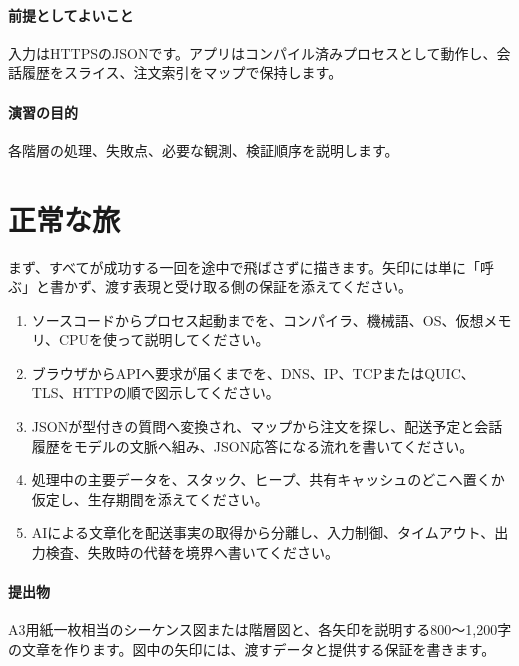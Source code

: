 \par
\endgroup
\medskip
\begingroup
\paragraph{前提としてよいこと}
        入力はHTTPSのJSONです。アプリはコンパイル済みプロセスとして動作し、会話履歴をスライス、注文索引をマップで保持します。

\paragraph{演習の目的}
        各階層の処理、失敗点、必要な観測、検証順序を説明します。

\par
\endgroup
\par
\endgroup


\section{正常な旅}
\label{sec:07-practice-16}

まず、すべてが成功する一回を途中で飛ばさずに描きます。矢印には単に「呼ぶ」と書かず、渡す表現と受け取る側の保証を添えてください。

\begingroup
  \begin{enumerate}
    \setlength{\itemsep}{1mm}
    \item ソースコードからプロセス起動までを、コンパイラ、機械語、OS、仮想メモリ、CPUを使って説明してください。
    \item ブラウザからAPIへ要求が届くまでを、DNS、IP、TCPまたはQUIC、TLS、HTTPの順で図示してください。
    \item JSONが型付きの質問へ変換され、マップから注文を探し、配送予定と会話履歴をモデルの文脈へ組み、JSON応答になる流れを書いてください。
    \item 処理中の主要データを、スタック、ヒープ、共有キャッシュのどこへ置くか仮定し、生存期間を添えてください。
    \item AIによる文章化を配送事実の取得から分離し、入力制御、タイムアウト、出力検査、失敗時の代替を境界へ書いてください。
  \end{enumerate}
  \vspace{1mm}
\paragraph{提出物}
    A3用紙一枚相当のシーケンス図または階層図と、各矢印を説明する800〜1,200字の文章を作ります。図中の矢印には、渡すデータと提供する保証を書きます。


